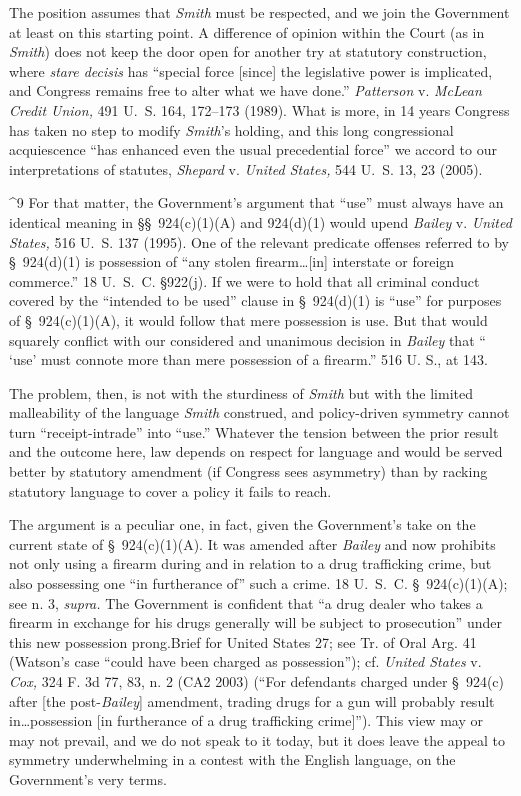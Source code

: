   The position assumes that \emph{Smith} must be respected, and we join
the Government at least on this starting point. A difference of opinion
within the Court (as in \emph{Smith}) does not keep the door open for
another try at statutory construction, where \emph{stare decisis} has
``special force [since] the legislative power is implicated, and
Congress remains free to alter what we have done.'' \emph{Patterson} v.
\emph{McLean Credit Union,} 491 U.~S. 164, 172--173 (1989). What is
more, in 14 years Congress has taken no step to modify \emph{Smith}'s
holding, and this long congressional acquiescence ``has enhanced even
the \newpage  usual precedential force'' we accord to our interpretations
of statutes, \emph{Shepard} v. \emph{United States,} 544 U.~S. 13, 23
(2005).

^9 For that matter, the Government's argument that ``use'' must
always have an identical meaning in \S\S~924(c)(1)(A) and 924(d)(1)
would upend \emph{Bailey} v. \emph{United States,} 516 U.~S. 137 (1995).
One of the relevant predicate offenses referred to by \S~924(d)(1)
is possession of ``any stolen firearm\dots [in] interstate or
foreign commerce.'' 18 U.~S.~C. \S922(j). If we were to hold that
all criminal conduct covered by the ``intended to be used'' clause in
\S~924(d)(1) is ``use'' for purposes of \S~924(c)(1)(A), it would
follow that mere possession is use. But that would squarely conflict
with our considered and unanimous decision in \emph{Bailey} that ``
‘use' must connote more than mere possession of a firearm.'' 516
U. S., at 143.

  The problem, then, is not with the sturdiness of \emph{Smith} but with
the limited malleability of the language \emph{Smith} construed, and
policy-driven symmetry cannot turn ``receipt-intrade'' into ``use.''
Whatever the tension between the prior result and the outcome here, law
depends on respect for language and would be served better by statutory
amendment (if Congress sees asymmetry) than by racking statutory
language to cover a policy it fails to reach.

  The argument is a peculiar one, in fact, given the Government's
take on the current state of \S~924(c)(1)(A). It was amended after
\emph{Bailey} and now prohibits not only using a firearm during and in
relation to a drug trafficking crime, but also possessing one ``in
furtherance of'' such a crime. 18 U.~S.~C. \S~924(c)(1)(A); see n.
3, \emph{supra.} The Government is confident that ``a drug dealer who
takes a firearm in exchange for his drugs generally will be subject to
prosecution'' under this new possession prong.Brief for United States
27; see Tr. of Oral Arg. 41 (Watson's case ``could have been charged
as possession''); cf. \emph{United States} v. \emph{Cox,} 324 F. 3d 77,
83, n. 2 (CA2 2003) (``For defendants charged under \S~924(c) after
[the post-\emph{Bailey}] amendment, trading drugs for a gun will probably
result in\dots possession [in furtherance of a drug trafficking
crime]''). This view may or may not prevail, and we do not speak to
it today, but it does leave the appeal to symmetry underwhelming in a
contest with the English language, on the Government's very terms.


